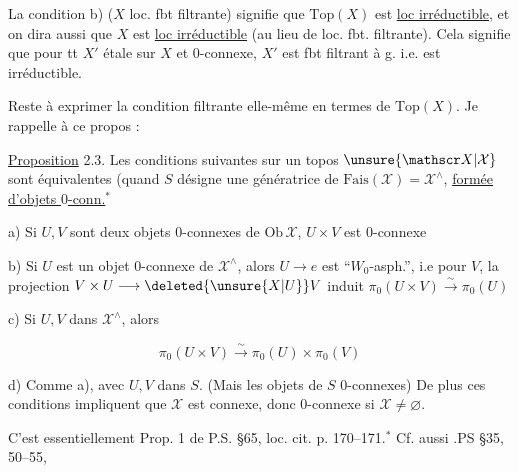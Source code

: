 La condition b) ($X$ loc. fbt filtrante) signifie que $\mathrm{Top}(X)$ est \uline{loc irréductible}, et on dira aussi que $X$ est \uline{loc irréductible} (au lieu de loc. fbt. filtrante). Cela signifie que pour tt $X'$ étale sur $X$ et $0$-connexe, $X'$ est fbt filtrant à g. i.e. est irréductible.

Reste à exprimer la condition filtrante elle-même en termes de $\mathrm{Top}(X)$. Je rappelle à ce propos :

\uline{Proposition} 2.3. Les conditions suivantes sur un topos $\unsure{\mathscr X|\mathcal X}$ sont équivalentes (quand $S$  désigne une  génératrice de $\mathrm{Fais}(\mathscr X)=\mathscr X^{\wedge}$\deleted{\unsure{,}}, \uline{formée d'objets $0$-conn.}$^{*}$


a) Si $U,V$ sont deux objets $0$-connexes de $\mathrm{Ob}\,\mathscr X$, $U\times V$ est $0$-connexe

b) Si $U$ est un objet $0$-connexe de $\mathscr X^{\wedge}$, alors $U\longrightarrow e$ est ``$W_0$-asph.'', i.e pour  $V$, la projection $V\times U\longrightarrow\deleted{\unsure{X|U}}V$ induit $\pi_0(U\times V)\xrightarrow{\sim}\pi_0(U)$


c) Si $U,V$ dans $\mathscr X^{\wedge}$, alors

\[
\pi_0(U\times V)\xrightarrow{\sim}\pi_0(U)\times\pi_0(V)
\]

d) Comme a), avec $U,V$ dans $S$. (Mais   les objets de $S$ $0$-connexes)
De plus  ces conditions impliquent que $\mathscr X$ est connexe, donc $0$-connexe si $\mathscr X\ne\varnothing$.



C'est essentiellement Prop. 1 de P.S. \S65, loc. cit. p. 170--171.$^{*}$ Cf. aussi .PS \S35,  50--55,

